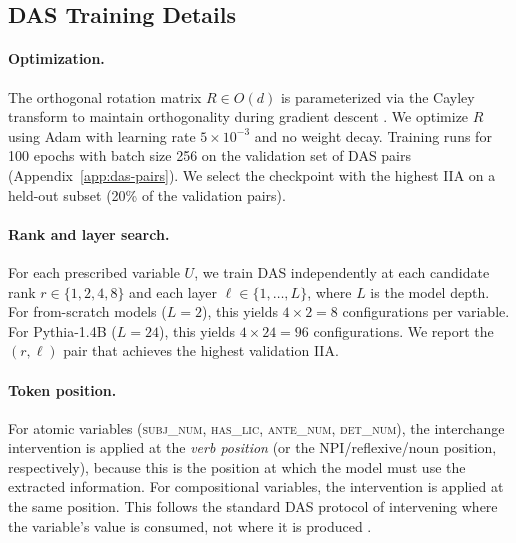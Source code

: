 \documentclass[11pt]{article}
\begin{document}
\subsection{DAS Training Details}
\label{app:das-details}

\paragraph{Optimization.}
The orthogonal rotation matrix $R \in O(d)$ is parameterized via the Cayley transform to maintain orthogonality during gradient descent \citep{DBLP:conf/clear2/GeigerWPIG24}.
We optimize $R$ using Adam with learning rate $5 \times 10^{-3}$ and no weight decay.
Training runs for 100 epochs with batch size 256 on the validation set of DAS pairs (Appendix~\ref{app:das-pairs}).
We select the checkpoint with the highest IIA on a held-out subset (20\% of the validation pairs).

\paragraph{Rank and layer search.}
For each prescribed variable $U$, we train DAS independently at each candidate rank $r \in \{1, 2, 4, 8\}$ and each layer $\ell \in \{1, \ldots, L\}$, where $L$ is the model depth.
For from-scratch models ($L = 2$), this yields $4 \times 2 = 8$ configurations per variable.
For Pythia-1.4B ($L = 24$), this yields $4 \times 24 = 96$ configurations.
We report the $(r, \ell)$ pair that achieves the highest validation IIA.

\paragraph{Token position.}
For atomic variables (\textsc{subj\_num}, \textsc{has\_lic}, \textsc{ante\_num}, \textsc{det\_num}), the interchange intervention is applied at the \emph{verb position} (or the NPI/reflexive/noun position, respectively), because this is the position at which the model must use the extracted information.
For compositional variables, the intervention is applied at the same position.
This follows the standard DAS protocol of intervening where the variable's value is consumed, not where it is produced \citep{DBLP:conf/clear2/GeigerWPIG24}.
\end{document}
